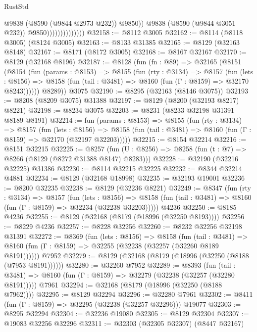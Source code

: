\begin{lexlean}{RustStd}
\begin{coremodule}
                                    @9838
                                    (@8590 (@9844 @2973 @232))
                                    @9850))
                                @9838
                                (@8590 (@9844 @3051 @232))
                                @9850))))))))))))))
@32158 := @8112 @3005
@32162 := @8114 (@8118 @3005) (@8124 @3005)
@32163 := @8133 @31385
@32165 := @8129 (@32163 @8148)
@32167 := @8171 (@8172 @3005)
@32168 := @8167 @32167
@32170 := @8129 (@32168 @8196)
@32187 := @8128
    (fun (fn : @89) =>
    @32165
      (@8151
        (@8154
          (fun (params : @8153) =>
          @8155
            (fun (rty : @3134) =>
            @8157
              (fun (lets : @8156) =>
              @8158 (fun (tail : @3481) => @8160 (fun (Γ : @8159) => @32170 @8243))))))
        @8289))
    @3075
@32190 := @8295 (@32163 (@8146 @3075))
@32193 := @8208 (@8209 @3075) @31388
@32197 := @8129 (@8200 (@32193 @8217) @8221)
@32198 := @8234 @3075
@32203 := @8231 (@8233 @32198 @31391 @8189 @8191)
@32214 := fun (params : @8153) =>
  @8155
    (fun (rty : @3134) =>
    @8157
      (fun (lets : @8156) =>
      @8158 (fun (tail : @3481) => @8160 (fun (Γ : @8159) => @32170 (@32197 @32203)))))
@32215 := @8154 @32214
@32216 := @8151 @32215
@32225 := @8257
    (fun (U : @8256) => @8258 (fun (t : @7) => @8266 (@8129 (@8272 @31388 @8147) @8283)))
@32228 := @32190 (@32216 @32225) @31386
@32230 := @8114 @32215 @32225
@32232 := @8344 @32214 @4881
@32234 := @8129 (@32168 @18998)
@32235 := @32193 @19001
@32236 := @8200 @32235
@32238 := @8129 (@32236 @8221)
@32249 := @8347
    (fun (rty : @3134) =>
    @8157
      (fun (lets : @8156) =>
      @8158 (fun (tail : @3481) => @8160 (fun (Γ : @8159) => @32234 (@32238 @32203)))))
    @4236
@32250 := @8185 @4236
@32255 := @8129 (@32168 (@8179 (@18996 (@32250 @8193))))
@32256 := @8229 @4236
@32257 := @8228 @32256
@32260 := @8232 @32256 @32198 @31391
@32272 := @8369
    (fun (lets : @8156) =>
    @8158
      (fun (tail : @3481) =>
      @8160 (fun (Γ : @8159) => @32255 (@32238 (@32257 (@32260 @8189 @8191))))))
    @7952
@32279 := @8129 (@32168 (@8179 (@18996 (@32250 (@8188 (@7953 @8191))))))
@32280 := @32260 @7952
@32289 := @8393
    (fun (tail : @3481) => @8160 (fun (Γ : @8159) => @32279 (@32238 (@32257 (@32280 @8191)))))
    @7961
@32294 := @32168 (@8179 (@18996 (@32250 (@8188 @7962))))
@32295 := @8129 @32294
@32296 := @32280 @7961
@32302 := @8411 (fun (Γ : @8159) => @32295 (@32238 (@32257 @32296))) @19077
@32303 := @8295 @32294
@32304 := @32236 @19080
@32305 := @8129 @32304
@32307 := @19083 @32256 @32296
@32311 := @32303 (@32305 @32307) (@8447 @32167)

\end{coremodule}
\end{lexlean}
